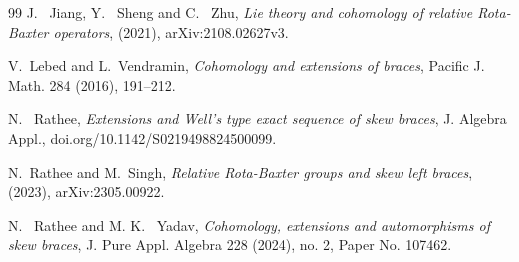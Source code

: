 \documentclass[11pt]{amsart}
\theoremstyle{thrm}
\theoremstyle{plain}
\theoremstyle{definition}
\numberwithin{equation}{section}
\begin{document}
\begin{thebibliography}{99}
J.~ Jiang, Y.~ Sheng and C.~ Zhu, \textit{Lie theory and cohomology of relative Rota-Baxter operators}, (2021), arXiv:2108.02627v3.


 V.~Lebed and L.~Vendramin, \textit{Cohomology and extensions of braces}, Pacific J. Math.  284 (2016),  191--212.

  
 N.~ Rathee, \textit{Extensions and Well’s type exact sequence of skew braces},   J. Algebra Appl., doi.org/10.1142/S0219498824500099.
 
  N.~Rathee and M.~Singh, \textit{Relative Rota-Baxter groups and skew left braces}, (2023), arXiv:2305.00922.


 N.~ Rathee and M. K. ~Yadav, \textit{Cohomology, extensions and automorphisms of skew braces}, J. Pure Appl. Algebra   228 (2024), no. 2, Paper No. 107462.
	
\end{thebibliography}
\end{document}

